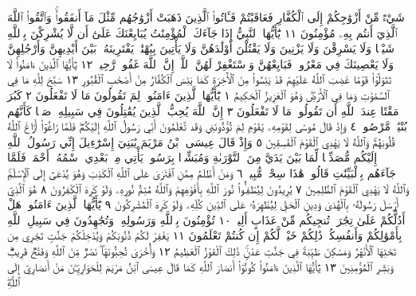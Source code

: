 شَيْءࣱ مِّنْ أَزْوَٰجِكُمْ إِلَى ٱلْكُفَّارِ فَعَاقَبْتُمْ فَـَٔاتُوا۟ ٱلَّذِينَ ذَهَبَتْ
أَزْوَٰجُهُم مِّثْلَ مَآ أَنفَقُوا۟ۚ وَٱتَّقُوا۟ ٱللَّهَ ٱلَّذِيٓ أَنتُم بِهِۦ مُؤْمِنُونَ ١١
يَٰٓأَيُّهَا ٱلنَّبِيُّ إِذَا جَآءَكَ ٱلْمُؤْمِنَٰتُ يُبَايِعْنَكَ عَلَىٰٓ أَن لَّا يُشْرِكْنَ بِٱللَّهِ
شَيْـࣰٔا وَلَا يَسْرِقْنَ وَلَا يَزْنِينَ وَلَا يَقْتُلْنَ أَوْلَٰدَهُنَّ وَلَا يَأْتِينَ
بِبُهْتَٰنࣲ يَفْتَرِينَهُۥ بَيْنَ أَيْدِيهِنَّ وَأَرْجُلِهِنَّ وَلَا يَعْصِينَكَ فِي
مَعْرُوفࣲ فَبَايِعْهُنَّ وَٱسْتَغْفِرْ لَهُنَّ ٱللَّهَۚ إِنَّ ٱللَّهَ غَفُورࣱ رَّحِيمࣱ ١٢
يَٰٓأَيُّهَا ٱلَّذِينَ ءَامَنُوا۟ لَا تَتَوَلَّوْا۟ قَوْمًا غَضِبَ ٱللَّهُ عَلَيْهِمْ قَدْ
يَئِسُوا۟ مِنَ ٱلْأٓخِرَةِ كَمَا يَئِسَ ٱلْكُفَّارُ مِنْ أَصْحَٰبِ ٱلْقُبُورِ ١٣
سَبَّحَ لِلَّهِ مَا فِي ٱلسَّمَٰوَٰتِ وَمَا فِي ٱلْأَرْضِۖ وَهُوَ ٱلْعَزِيزُ ٱلْحَكِيمُ ١
يَٰٓأَيُّهَا ٱلَّذِينَ ءَامَنُوا۟ لِمَ تَقُولُونَ مَا لَا تَفْعَلُونَ ٢
كَبُرَ مَقْتًا عِندَ ٱللَّهِ أَن تَقُولُوا۟ مَا لَا تَفْعَلُونَ ٣ إِنَّ
ٱللَّهَ يُحِبُّ ٱلَّذِينَ يُقَٰتِلُونَ فِي سَبِيلِهِۦ صَفࣰّا كَأَنَّهُم
بُنْيَٰنࣱ مَّرْصُوصࣱ ٤ وَإِذْ قَالَ مُوسَىٰ لِقَوْمِهِۦ يَٰقَوْمِ لِمَ
تُؤْذُونَنِي وَقَد تَّعْلَمُونَ أَنِّي رَسُولُ ٱللَّهِ إِلَيْكُمْۖ فَلَمَّا زَاغُوٓا۟
أَزَاغَ ٱللَّهُ قُلُوبَهُمْۚ وَٱللَّهُ لَا يَهْدِي ٱلْقَوْمَ ٱلْفَٰسِقِينَ ٥
وَإِذْ قَالَ عِيسَى ٱبْنُ مَرْيَمَ يَٰبَنِيٓ إِسْرَٰٓءِيلَ إِنِّي رَسُولُ ٱللَّهِ إِلَيْكُم مُّصَدِّقࣰا لِّمَا
بَيْنَ يَدَيَّ مِنَ ٱلتَّوْرَىٰةِ وَمُبَشِّرَۢا بِرَسُولࣲ يَأْتِي مِنۢ بَعْدِي ٱسْمُهُۥٓ أَحْمَدُۖ فَلَمَّا
جَآءَهُم بِٱلْبَيِّنَٰتِ قَالُوا۟ هَٰذَا سِحْرࣱ مُّبِينࣱ ٦ وَمَنْ أَظْلَمُ مِمَّنِ ٱفْتَرَىٰ عَلَى
ٱللَّهِ ٱلْكَذِبَ وَهُوَ يُدْعَىٰٓ إِلَى ٱلْإِسْلَٰمِۚ وَٱللَّهُ لَا يَهْدِي ٱلْقَوْمَ ٱلظَّٰلِمِينَ ٧
يُرِيدُونَ لِيُطْفِـُٔوا۟ نُورَ ٱللَّهِ بِأَفْوَٰهِهِمْ وَٱللَّهُ مُتِمُّ نُورِهِۦ وَلَوْ كَرِهَ
ٱلْكَٰفِرُونَ ٨ هُوَ ٱلَّذِيٓ أَرْسَلَ رَسُولَهُۥ بِٱلْهُدَىٰ وَدِينِ ٱلْحَقِّ لِيُظْهِرَهُۥ
عَلَى ٱلدِّينِ كُلِّهِۦ وَلَوْ كَرِهَ ٱلْمُشْرِكُونَ ٩ يَٰٓأَيُّهَا ٱلَّذِينَ ءَامَنُوا۟ هَلْ أَدُلُّكُمْ عَلَىٰ
تِجَٰرَةࣲ تُنجِيكُم مِّنْ عَذَابٍ أَلِيمࣲ ١٠ تُؤْمِنُونَ بِٱللَّهِ وَرَسُولِهِۦ وَتُجَٰهِدُونَ
فِي سَبِيلِ ٱللَّهِ بِأَمْوَٰلِكُمْ وَأَنفُسِكُمْۚ ذَٰلِكُمْ خَيْرࣱ لَّكُمْ إِن كُنتُمْ تَعْلَمُونَ ١١
يَغْفِرْ لَكُمْ ذُنُوبَكُمْ وَيُدْخِلْكُمْ جَنَّٰتࣲ تَجْرِي مِن تَحْتِهَا ٱلْأَنْهَٰرُ وَمَسَٰكِنَ
طَيِّبَةࣰ فِي جَنَّٰتِ عَدْنࣲۚ ذَٰلِكَ ٱلْفَوْزُ ٱلْعَظِيمُ ١٢ وَأُخْرَىٰ تُحِبُّونَهَاۖ نَصْرࣱ
مِّنَ ٱللَّهِ وَفَتْحࣱ قَرِيبࣱۗ وَبَشِّرِ ٱلْمُؤْمِنِينَ ١٣ يَٰٓأَيُّهَا ٱلَّذِينَ ءَامَنُوا۟ كُونُوٓا۟
أَنصَارَ ٱللَّهِ كَمَا قَالَ عِيسَى ٱبْنُ مَرْيَمَ لِلْحَوَارِيِّـۧنَ مَنْ أَنصَارِيٓ إِلَى ٱللَّهِۖ
